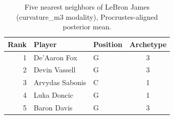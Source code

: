 \begin{table}[htbp]
  \centering\small
  \begin{tabular}{rllc}
    \toprule
    Rank & Player & Position & Archetype \\
    \midrule
    1 & De'Aaron Fox & G & 3 \\
    2 & Devin Vassell & G & 3 \\
    3 & Arvydas Sabonis & C & 1 \\
    4 & Luka Doncic & G & 1 \\
    5 & Baron Davis & G & 3 \\
    \bottomrule
  \end{tabular}
  \caption{Five nearest neighbors of LeBron James (curvature_m3 modality), Procrustes-aligned posterior mean.}
  \label{tab:LeBron_James_neighbors_curvature_m3}
\end{table}

